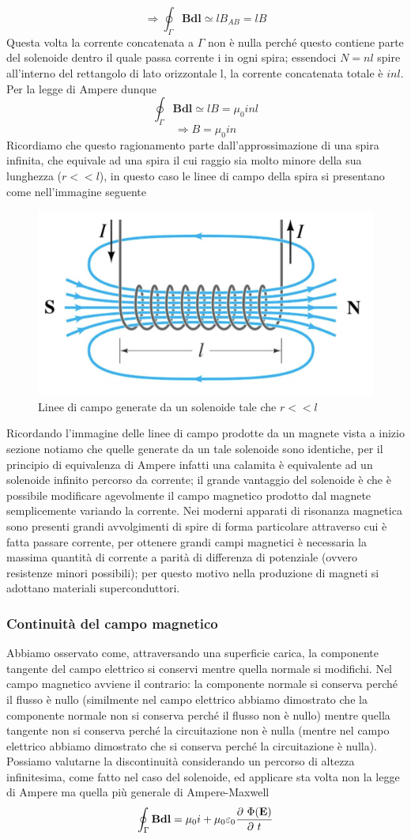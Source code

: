 \documentclass[
10pt, %
a4paper, %
oneside, %
headinclude,footinclude, %
BCOR5mm, %
]{scrartcl}
\begin{document}
\FloatBarrier
\[\Rightarrow \oint_{\Gamma}\mathbf{B}\mathbf{dl}\simeq lB_{AB}= lB\]
Questa volta la corrente concatenata a $\Gamma$ non è nulla perché questo contiene parte del solenoide dentro il quale passa corrente i in ogni spira; essendoci \(N = n l\) spire all'interno del rettangolo di lato orizzontale l, la corrente concatenata totale è \(inl\). Per la legge di Ampere dunque
\[\oint_{\Gamma}\mathbf{B}\mathbf{dl}\simeq lB= \mu_0 inl\]
\[\Rightarrow B = \mu_0 i n\]
Ricordiamo che questo ragionamento parte dall'approssimazione di una spira infinita, che equivale ad una spira il cui raggio sia molto minore della sua lunghezza (\(r<<l\)), in questo caso le linee di campo della spira si presentano come nell'immagine seguente
\begin{figure}[h!]
	\centering
	\includegraphics[width=0.6\linewidth]{../images/linee_campo_solenoide}
	\caption{Linee di campo generate da un solenoide tale che \(r<<l\)}
	\label{fig:lineecamposolenoide}
\end{figure}
\FloatBarrier
Ricordando l'immagine delle linee di campo prodotte da un magnete vista a inizio sezione notiamo che quelle generate da un tale solenoide sono identiche, per il principio di equivalenza di Ampere infatti una calamita è equivalente ad un solenoide infinito percorso da corrente; il grande vantaggio del solenoide è che è possibile modificare agevolmente il campo magnetico prodotto dal magnete semplicemente variando la corrente. Nei moderni apparati di risonanza magnetica sono presenti grandi avvolgimenti di spire di forma particolare attraverso cui è fatta passare corrente, per ottenere grandi campi magnetici è necessaria la massima quantità di corrente a parità di differenza di potenziale (ovvero resistenze minori possibili); per questo motivo nella produzione di magneti si adottano materiali superconduttori. 
\subsubsection{Continuità del campo magnetico}
Abbiamo osservato come, attraversando una superficie carica, la componente tangente del campo elettrico si conservi mentre quella normale si modifichi. Nel campo magnetico avviene il contrario: la componente normale si conserva perché il flusso è nullo (similmente nel campo elettrico abbiamo dimostrato che la componente normale non si conserva perché il flusso non è nullo) mentre quella tangente non si conserva perché la circuitazione non è nulla (mentre nel campo elettrico abbiamo dimostrato che si conserva perché la circuitazione è nulla). Possiamo valutarne la discontinuità considerando un percorso di altezza infinitesima, come fatto nel caso del solenoide, ed applicare sta volta non la legge di Ampere ma quella più generale di Ampere-Maxwell
\[\oint_{\Gamma}\mathbf{B}\mathbf{dl}=\mu_0 i + \mu_0\varepsilon_0 \frac{\partial\  \Phi(\mathbf{E})}{\partial\  t}\]
\end{document}
